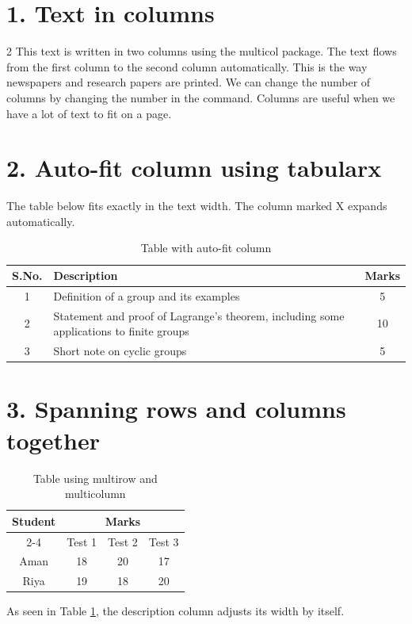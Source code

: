 \documentclass[12pt]{article}
\begin{document}
\section*{1. Text in columns}
\begin{multicols}{2}
This text is written in two columns using the multicol package. The text flows from the first column to the second column automatically. This is the way newspapers and research papers are printed. We can change the number of columns by changing the number in the command. Columns are useful when we have a lot of text to fit on a page.
\end{multicols}

\section*{2. Auto-fit column using tabularx}
The table below fits exactly in the text width. The column marked X expands automatically.

\begin{table}[h]
\centering
\begin{tabularx}{\textwidth}{|c|X|c|}
\hline
\textbf{S.No.} & \textbf{Description} & \textbf{Marks} \\
\hline
1 & Definition of a group and its examples & 5 \\
\hline
2 & Statement and proof of Lagrange's theorem, including some applications to finite groups & 10 \\
\hline
3 & Short note on cyclic groups & 5 \\
\hline
\end{tabularx}
\caption{Table with auto-fit column}
\label{tab:auto}
\end{table}

\section*{3. Spanning rows and columns together}
\begin{table}[h]
\centering
\begin{tabular}{|c|c|c|c|}
\hline
\multirow{2}{*}{Student} & \multicolumn{3}{c|}{Marks} \\
\cline{2-4}
 & Test 1 & Test 2 & Test 3 \\
\hline
Aman & 18 & 20 & 17 \\
\hline
Riya & 19 & 18 & 20 \\
\hline
\end{tabular}
\caption{Table using multirow and multicolumn}
\end{table}

As seen in Table \ref{tab:auto}, the description column adjusts its width by itself.
\end{document}
